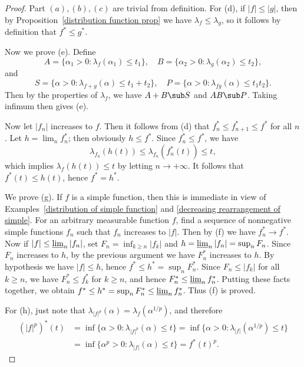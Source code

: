 \begin{proof}
Part $(a),(b),(c)$ are trivial from definition. For (d), if $|f|\leq|g|$, then by Proposition~\ref{distribution function prop} we have $\lambda_f\leq\lambda_g$, so it follows by definition that $f^*\leq g^*$.\par
Now we prove (e). Define
\[A=\{\alpha_1>0:\lambda_f(\alpha_1)\leq t_1\},\quad B=\{\alpha_2>0:\lambda_g(\alpha_2)\leq t_2\},\]
and
\[S=\{\alpha>0:\lambda_{f+g}(\alpha)\leq t_1+t_2\},\quad P=\{\alpha>0:\lambda_{fg}(\alpha)\leq t_1t_2\}.\]
Then by the properties of $\lambda_f$, we have $A+B\sub S$ and $AB\sub P$. Taking infimum then gives (e).\par
Now let $|f_n|$ increases to $f$. Then it follows from (d) that $f_n^*\leq f_{n+1}^*\leq f^*$ for all $n$. Let $h=\lim_nf_n^*$; then obviously $h\leq f^*$. Since $f_n^*\leq f^*$, we have
\[\lambda_{f_n}(h(t))\leq\lambda_{f_n}(f_n^*(t))\leq t,\]
which implies $\lambda_f(h(t))\leq t$ by letting $n\to+\infty$. It follows that $f^*(t)\leq h(t)$, hence $f^*=h^*$.\par
We prove (g). If $f$ is a simple function, then this is immediate in view of Examples~\ref{distribution of simple function} and \ref{decreasing rearrangement of simple}. For an arbitrary measurable function $f$, find a sequence of nonnegative simple functions $f_n$ such that $f_n$ increases to $|f|$. Then by (f) we have $f_n^*\to f^*$. Now if $|f|\leq\varliminf_n|f_n|$, set $F_n=\inf_{k\geq n}|f_k|$ and $h=\varliminf_n|f_n|=\sup_nF_n$. Since $F_n$ increases to $h$, by the previous argument we have $F_n^*$ increases to $h$. By hypothesis we have $|f|\leq h$, hence $f^*\leq h^*=\sup_nF_n^*$. Since $F_n\leq|f_k|$ for all $k\geq n$, we have $F_n^*\leq f_k^*$ for $k\geq n$, and hence $F_n^*\leq\varliminf_nf_n^*$. Putting these facts together, we obtain $f^*\leq h^*=\sup_n F_n^*\leq\varliminf_nf_n^*$. Thus (f) is proved.\par
For (h), just note that $\lambda_{|f|^p}(\alpha)=\lambda_f(\alpha^{1/p})$, and therefore
\begin{align*}
(|f|^p)^*(t)&=\inf\{\alpha>0:\lambda_{|f|^p}(\alpha)\leq t\}=\inf\{\alpha>0:\lambda_{|f|}(\alpha^{1/p})\leq t\}\\
&=\inf\{\alpha^p>0:\lambda_{|f|}(\alpha)\leq t\}=f^*(t)^{p}.
\end{align*}


\end{proof}
